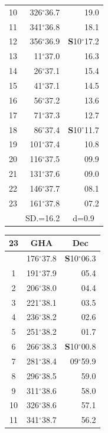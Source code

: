 \documentclass[10pt, a4paper]{report}
\begin{document}
\begin{scriptsize}
\begin{tabular*}{0.2\textwidth}[t]{@{\extracolsep{\fill}}|c|rr|}
10 & 326$^\circ$36.7 & 19.0\\
11 & 341$^\circ$36.8 & 18.1\\[2Pt]
12 & 356$^\circ$36.9 & \textbf{S}10$^\circ$17.2\\
13 & 11$^\circ$37.0 & 16.3\\
14 & 26$^\circ$37.1 & 15.4\\
15 & 41$^\circ$37.1 & \raisebox{0.24ex}{\boldmath$\cdot$~\boldmath$\cdot$~~}14.5\\
16 & 56$^\circ$37.2 & 13.6\\
17 & 71$^\circ$37.3 & 12.7\\[2Pt]
18 & 86$^\circ$37.4 & \textbf{S}10$^\circ$11.7\\
19 & 101$^\circ$37.4 & 10.8\\
20 & 116$^\circ$37.5 & 09.9\\
21 & 131$^\circ$37.6 & \raisebox{0.24ex}{\boldmath$\cdot$~\boldmath$\cdot$~~}09.0\\
22 & 146$^\circ$37.7 & 08.1\\
23 & 161$^\circ$37.8 & 07.2\\
\hline
\rule{0pt}{2.4ex} & \multicolumn{1}{c}{SD.=16.2} & \multicolumn{1}{c|}{d=0.9}\\
\hline
\end{tabular*}\noindent
\begin{tabular*}{0.2\textwidth}[t]{@{\extracolsep{\fill}}|c|rr|}
\hline
\multicolumn{1}{|c|}{\rule{0pt}{2.6ex}\textbf{23}} & \multicolumn{1}{c}{\textbf{GHA}} & \multicolumn{1}{c|}{\textbf{Dec}}\\
\hline\rule{0pt}{2.6ex}\noindent
0 & 176$^\circ$37.8 & \textbf{S}10$^\circ$06.3\\
1 & 191$^\circ$37.9 & 05.4\\
2 & 206$^\circ$38.0 & 04.4\\
3 & 221$^\circ$38.1 & \raisebox{0.24ex}{\boldmath$\cdot$~\boldmath$\cdot$~~}03.5\\
4 & 236$^\circ$38.2 & 02.6\\
5 & 251$^\circ$38.2 & 01.7\\[2Pt]
6 & 266$^\circ$38.3 & \textbf{S}10$^\circ$00.8\\
7 & 281$^\circ$38.4 & 09$^\circ$59.9\\
8 & 296$^\circ$38.5 & 59.0\\
9 & 311$^\circ$38.6 & \raisebox{0.24ex}{\boldmath$\cdot$~\boldmath$\cdot$~~}58.0\\
10 & 326$^\circ$38.6 & 57.1\\
11 & 341$^\circ$38.7 & 56.2\\[2Pt]

\end{tabular*}
\end{scriptsize}
\end{document}
